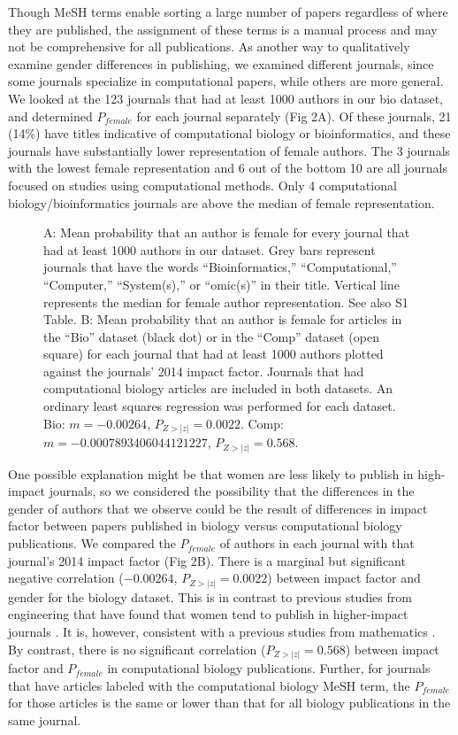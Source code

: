 \documentclass[10pt,letterpaper]{article}
\begin{document}
\begin{flushleft}
Though MeSH terms enable sorting a large number of papers regardless of where they are published, the assignment of these terms is a manual process and may not be comprehensive for all publications. As another way to qualitatively examine gender differences in publishing, we examined different journals, since some journals specialize in computational papers, while others are more general. We looked at the 123  journals that had at least 1000 authors in our bio dataset, and determined $P_{female}$ for each journal separately (Fig 2A). Of these journals, 21 (14\%) have titles indicative of computational biology or bioinformatics, and these journals have substantially lower representation of female authors. The 3 journals with the lowest female representation and 6 out of the bottom 10 are all journals focused on studies using computational methods. Only 4 computational biology/bioinformatics journals are above the median of female representation.

\begin{figure}[!h]
  \caption{
  A: Mean probability that an author is female for every journal that had at least 1000 authors in our dataset. Grey bars represent journals that have the words “Bioinformatics,” “Computational,” “Computer,” “System(s),” or “omic(s)” in their title. Vertical line represents the median for female author representation. See also S1 Table. B: Mean probability that an author is female for articles in the “Bio” dataset (black dot) or in the “Comp” dataset (open square) for each journal that had at least 1000 authors plotted against the journals’ 2014 impact factor. Journals that had computational biology articles are included in both datasets. An ordinary least squares regression was performed for each dataset. Bio: $m = -0.00264$, $P_{Z>|z|} = 0.0022$. Comp: $m = -0.0007893406044121227$, $P_{Z>|z|} = 0.568$.}
  \label{fig2}
\end{figure}

One possible explanation might be that women are less likely to publish in high-impact journals, so we considered the possibility that the differences in the gender of authors that we observe could be the result of differences in impact factor between papers published in biology versus computational biology publications. We compared the $P_{female}$ of authors in each journal with that journal’s 2014 impact factor (Fig 2B). There is a marginal but significant negative correlation ($-0.00264$, $P_{Z > |z|} = 0.0022$) between impact factor and gender for the biology dataset. This is in contrast to previous studies from engineering that have found that women tend to publish in higher-impact journals \cite{Ghiasi2015}. It is, however, consistent with a previous studies from mathematics \cite{Mihaljevic-Brandt2016}. By contrast, there is no significant correlation ($P_{Z > |z|} = 0.568$) between impact factor and $P_{female}$ in computational biology publications. Further, for journals that have articles labeled with the computational biology MeSH term, the $P_{female}$ for those articles is the same or lower than that for all biology publications in the same journal.


\end{flushleft}
\end{document}
